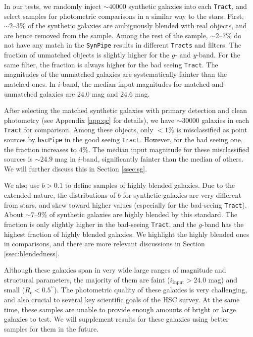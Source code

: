 \documentclass[useamsfonts]{pasj01}
\def\asec{$^{\prime\prime}$}
\def\hscpipe{\texttt{hscPipe}}
\def\synpipe{\texttt{SynPipe}}
\def\tract{\texttt{Tract}}
\def\tracts{\texttt{Tracts}}
\begin{document}
    In our tests, we randomly inject ${\sim}40000$ synthetic galaxies into each 
    \tract{}, and select samples for photometric comparisons in a similar way to the
    stars. 
    First, ${\sim}2$--$3$\% of the synthetic galaxies are ambiguously blended with 
    real objects, and are hence removed from the sample. 
    Among the rest of the sample, ${\sim}2$--$7$\% do not have any match in the 
    \synpipe{} results in different \tracts{} and filters. 
    The fraction of unmatched objects is slightly higher for the $g$- and $y$-band. 
    For the same filter, the fraction is always higher for the bad seeing \tract{}.
    The magnitudes of the unmatched galaxies are systematically fainter than the 
    matched ones. 
    In $i$-band, the median input magnitudes for matched and unmatched galaxies are 
    $24.0$ mag and $24.6$ mag. 
    
    After selecting the matched synthetic galaxies with primary detection and 
    clean photometry (see Appendix \ref{app:qc} for details), we have ${\sim}30000$
    galaxies in each \tract{} for comparison.  
    Among these objects, only $<1$\% is misclassified as point sources by \hscpipe{}
    in the good seeing \tract{}.  
    However, for the bad seeing one, the fraction increases to $4$\%.  
    The median input magnitude for these misclassified sources is ${\sim}24.9$ mag 
    in $i$-band, significantly fainter than the median of others.  
    We will further discuss this in Section \ref{ssec:sg}.
    
    We also use $b>0.1$ to define samples of highly blended galaxies.
    Due to the extended nature, the distributions of $b$ for synthetic galaxies are 
    very different from stars, and skew toward higher values (especially for the 
    bad-seeing \tract{}). 
    About ${\sim}7$--$9$\% of synthetic galaxies are highly blended by this standard.
    The fraction is only slightly higher in the bad-seeing \tract{}, and the 
    $g$-band has the highest fraction of highly blended galaxies. 
    We highlight the highly blended ones in comparisons, and there are more relevant 
    discussions in Section \ref{ssec:blendedness}.
    
    Although these galaxies span in very wide large ranges of magnitude and 
    structural parameters, the majority of them are faint 
    ($i_{\mathrm{Input}} > 24.0$ mag) and small ($R_{\mathrm{e}} < 0.5$\asec). 
    The photometric quality of these galaxies is very challenging, and also crucial
    to several key scientific goals of the HSC survey. 
    At the same time, these samples are unable to provide enough amounts of 
    bright or large galaxies to test. 
    We will supplement results for these galaxies using better samples for them 
    in the future. 
\end{document}
